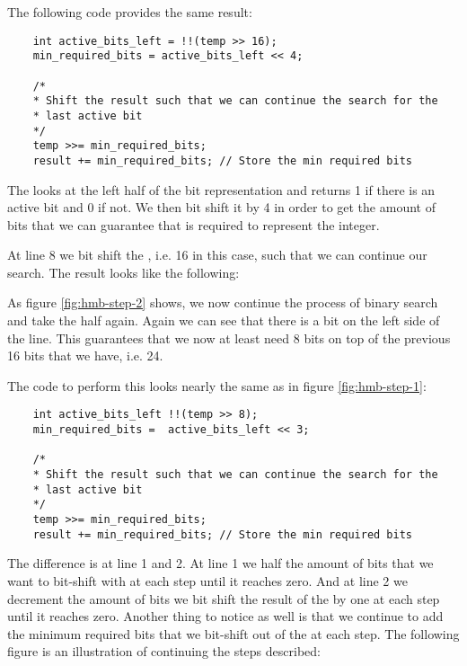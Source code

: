 The following code provides the same result:
\begin{lstlisting}
    int active_bits_left = !!(temp >> 16);
    min_required_bits = active_bits_left << 4;
    
    /* 
    * Shift the result such that we can continue the search for the 
    * last active bit 
    */
    temp >>= min_required_bits;
    result += min_required_bits; // Store the min required bits
\end{lstlisting}

The  looks at the left half of the bit representation and returns 1 if there is an active bit and 0 if not. We then bit shift it by 4 in order to get the amount of bits 
that we can guarantee that is required to represent the integer. 

At line 8 we bit shift the , i.e. 16 in this case, such that we can continue our search. The result looks like the following:

As figure \ref{fig:hmb-step-2} shows, we now continue the process of binary search and take the half again. Again we can see that there is
a bit on the left side of the line. This guarantees that we now at least need 8 bits on top of the previous 16 bits that we have, i.e. 24.

The code to perform this looks nearly the same as in figure \ref{fig:hmb-step-1}:
\begin{lstlisting}
    int active_bits_left !!(temp >> 8);
    min_required_bits =  active_bits_left << 3;

    /* 
    * Shift the result such that we can continue the search for the 
    * last active bit 
    */
    temp >>= min_required_bits;
    result += min_required_bits; // Store the min required bits
\end{lstlisting}

The difference is at line 1 and 2. At line 1 we half the amount of bits that we want to bit-shift with at each step until it reaches zero. And at line 2 we decrement the 
amount of bits we bit shift the result of the  by one at each step until it reaches zero. 
Another thing to notice as well is that we continue to add the minimum required bits that we bit-shift out of the  at each step.
The following figure is an illustration of continuing the steps described: 

